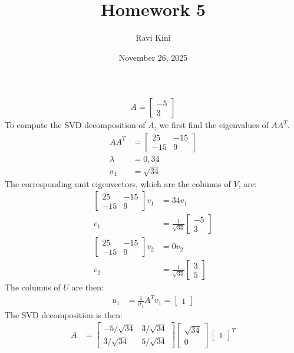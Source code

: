 \documentclass{article}
\title{Homework 5}
\author{Ravi Kini}
\date{November 26, 2025}
\begin{document}
\maketitle

\problem{}
\begin{align*}
    A = \begin{bmatrix}
        -5 \\ 3
    \end{bmatrix}
\end{align*}
To compute the SVD decomposition of $A$, we first find the eigenvalues of $AA^T$.
\begin{align*}
    AA^T & = \begin{bmatrix}
        25 & -15 \\ -15 & 9
    \end{bmatrix} \\
    \lambda & = 0, 34 \\
    \sigma_1 & = \sqrt{34}
\end{align*}
The corresponding unit eigenvectors, which are the columns of $V$, are:
\begin{align*}
    \begin{bmatrix}
        25 & -15 \\ -15 & 9
    \end{bmatrix}v_1 & = 34v_1 \\
    v_1 & = \frac{1}{\sqrt{34}}\begin{bmatrix}
        -5 \\ 3
    \end{bmatrix} \\
    \begin{bmatrix}
        25 & -15 \\ -15 & 9
    \end{bmatrix}v_2 & = 0v_2 \\
    v_2 & = \frac{1}{\sqrt{34}}\begin{bmatrix}
        3 \\ 5
    \end{bmatrix}
\end{align*}
The columns of $U$ are then:
\begin{align*}
    u_1 & = \frac{1}{\sigma_1}A^Tv_1 = \begin{bmatrix}
        1
    \end{bmatrix}
\end{align*}
The SVD decomposition is then:
\begin{align*}
    A & = \begin{bmatrix}
        -5/\sqrt{34} & 3/\sqrt{34} \\ 3/\sqrt{34} & 5/\sqrt{34}
    \end{bmatrix}\begin{bmatrix}
        \sqrt{34} \\ 0
    \end{bmatrix}\begin{bmatrix}
        1
    \end{bmatrix}^T
\end{align*}
\end{document}

